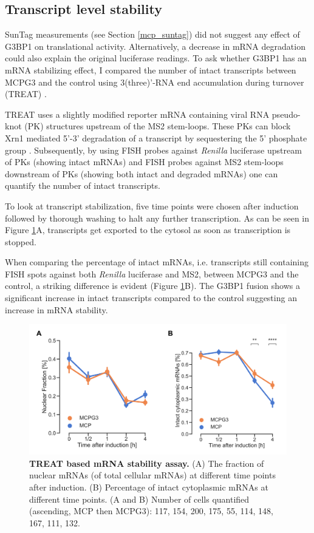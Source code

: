 \subsection{Transcript level stability} \label{mcp_treat}

SunTag measurements (see Section \ref{mcp_suntag}) did not suggest any effect of G3BP1 on translational activity.
Alternatively, a decrease in mRNA degradation could also explain the original luciferase readings.
To ask whether G3BP1 has an mRNA stabilizing effect, I compared the number of intact transcripts between MCPG3 and the control using 3(three)'-RNA end accumulation during turnover (TREAT) \cite{horvathova_dynamics_2017}.

TREAT uses a slightly modified reporter mRNA containing viral RNA pseudo-knot (PK) structures upstream of the MS2 stem-loops.
These PKs can block Xrn1 mediated 5'-3' degradation of a transcript by sequestering the 5' phosphate group \cite{kieft_new_2015}.
Subsequently, by using FISH probes against \textit{Renilla} luciferase upstream of PKs (showing intact mRNAs) and
    FISH probes against MS2 stem-loops downstream of PKs (showing both intact and degraded mRNAs) one can
    quantify the number of intact transcripts.

To look at transcript stabilization, five time points were chosen after induction followed by thorough washing to halt any further transcription.
As can be seen in Figure \ref{fig:mcp_treat}A, transcripts get exported to the cytosol as soon as transcription is stopped.

When comparing the percentage of intact mRNAs, i.e. transcripts still containing FISH spots 
    against both \textit{Renilla} luciferase and MS2, between MCPG3 and the control, a striking difference is evident (Figure \ref{fig:mcp_treat}B).
The G3BP1 fusion shows a significant increase in intact transcripts compared to the control suggesting an
    increase in mRNA stability.


\begin{figure}[h]
    \centering
    \includegraphics[width=\linewidth]{images/figure5}
    \caption{\textbf{TREAT based mRNA stability assay.}
        (A) The fraction of nuclear mRNAs (of total cellular mRNAs)
            at different time points after induction.
        (B) Percentage of intact cytoplasmic mRNAs at different time points.
        (A and B) Number of cells quantified (ascending, MCP then MCPG3):
            117, 154, 200, 175, 55, 114, 148, 167, 111, 132.
    }
    \label{fig:mcp_treat}
\end{figure}

